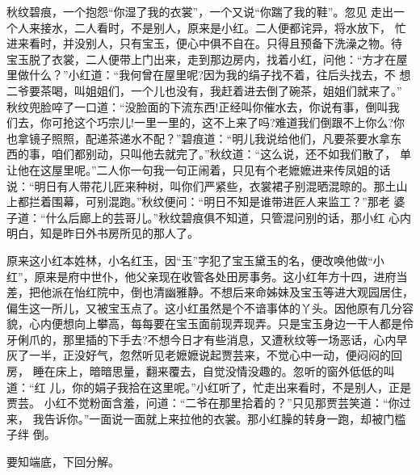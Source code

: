 秋纹碧痕，一个抱怨“你湿了我的衣裳”，一个又说“你踹了我的鞋”。忽见
走出一个人来接水，二人看时，不是别人，原来是小红。二人便都诧异，将水放下，
忙进来看时，并没别人，只有宝玉，便心中俱不自在。只得且预备下洗澡之物。待
宝玉脱了衣裳，二人便带上门出来，走到那边房内，找着小红，问他：“方才在屋
里做什么？”小红道：“我何曾在屋里呢?因为我的绢子找不着，往后头找去，不
想二爷要茶喝，叫姐姐们，一个儿也没有，我赶着进去倒了碗茶，姐姐们就来了。”
秋纹兜脸啐了一口道：“没脸面的下流东西!正经叫你催水去，你说有事，倒叫我
们去，你可抢这个巧宗儿!一里一里的，这不上来了吗?难道我们倒跟不上你么?你
也拿镜子照照，配递茶递水不配？”碧痕道：“明儿我说给他们，凡要茶要水拿东
西的事，咱们都别动，只叫他去就完了。”秋纹道：“这么说，还不如我们散了，
单让他在这屋里呢。”二人你一句我一句正闹着，只见有个老嬷嬷进来传凤姐的话
说：“明日有人带花儿匠来种树，叫你们严紧些，衣裳裙子别混晒混晾的。那土山
上都拦着围幕，可别混跑。”秋纹便问：“明日不知是谁带进匠人来监工？”那老
婆子道：“什么后廊上的芸哥儿。”秋纹碧痕俱不知道，只管混问别的话，那小红
心内明白，知是昨日外书房所见的那人了。

原来这小红本姓林，小名红玉，因“玉”字犯了宝玉黛玉的名，便改唤他做“小
红”，原来是府中世仆，他父亲现在收管各处田房事务。这小红年方十四，进府当
差，把他派在怡红院中，倒也清幽雅静。不想后来命姊妹及宝玉等进大观园居住，
偏生这一所儿，又被宝玉点了。这小红虽然是个不谙事体的丫头。因他原有几分容
貌，心内便想向上攀高，每每要在宝玉面前现弄现弄。只是宝玉身边一干人都是伶
牙俐爪的，那里插的下手去?不想今日才有些消息，又遭秋纹等一场恶话，心内早
灰了一半，正没好气，忽然听见老嬷嬷说起贾芸来，不觉心中一动，便闷闷的回房，
睡在床上，暗暗思量，翻来覆去，自觉没情没趣的。忽听的窗外低低的叫道：“红
儿，你的娟子我拾在这里呢。”小红听了，忙走出来看时，不是别人，正是贾芸。
小红不觉粉面含羞，问道：“二爷在那里拾着的？”只见那贾芸笑道：“你过来，
我告诉你。”一面说一面就上来拉他的衣裳。那小红臊的转身一跑，却被门槛子绊
倒。

要知端底，下回分解。